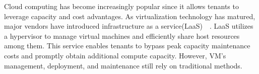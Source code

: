 











Cloud computing has become increasingly popular since it allows tenants to leverage capacity and cost advantages. As virtualization technology has matured, major vendors have introduced infrastructure as a service(LaaS)~\cite*{8031522}~\cite*{10.1145/2767181}. LaaS utilizes a hypervisor to manage 
virtual machines and efficiently share host resources among them. This service enables tenants to bypass peak capacity maintenance costs and promptly obtain additional compute capacity. However, VM's management, deployment, and maintenance still rely on traditional methods.
 

